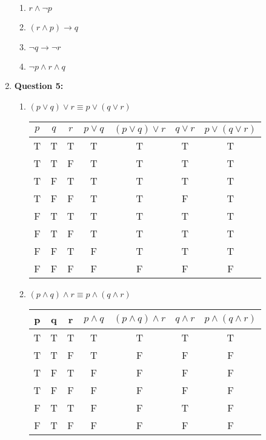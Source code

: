 \documentclass[11pt]{article}
\begin{document}
\begin{enumerate}
\begin{enumerate}[label=(\alph*)]
    \item $r\land\lnot p$
    \item $(r\land p)\rightarrow q$
    \item $\lnot q\rightarrow\lnot r$
    \item $\lnot p\land r\land q$
\end{enumerate}
\item \textbf{Question 5:}
\begin{enumerate}[label=(\alph*)]
    \item $(p \lor q) \lor r \equiv p \lor (q \lor r)$
    \begin{center}
        \begin{tabular}{|c|c|c|c|c|c|c|}
            \hline
            $p$ & $q$ & $r$ & $p \lor q$ & $(p \lor q) \lor r$ & $q \lor r$ & $p \lor (q \lor r)$ \\
            \hline
            T & T & T & T & T & T & T \\
            T & T & F & T & T & T & T \\
            T & F & T & T & T & T & T \\
            T & F & F & T & T & F & T \\
            F & T & T & T & T & T & T \\
            F & T & F & T & T & T & T \\
            F & F & T & F & T & T & T \\
            F & F & F & F & F & F & F \\
            \hline
        \end{tabular}
    \end{center}
    \item $(p \land q) \land r \equiv p \land (q \land r)$
    \begin{center}
        \begin{tabular}{|c|c|c|c|c|c|c|}
            \hline
            p & q & r & $p\land q$ & $(p\land q)\land r$ & $q\land r$ & $p\land(q\land r)$\\
            \hline
            T & T & T & T & T & T & T \\
            T & T & F & T & F & F & F \\
            T & F & T & F & F & F & F \\
            T & F & F & F & F & F & F \\
            F & T & T & F & F & T & F \\
            F & T & F & F & F & F & F \\

\end{tabular}
\end{center}
\end{enumerate}
\end{enumerate}
\end{document}
